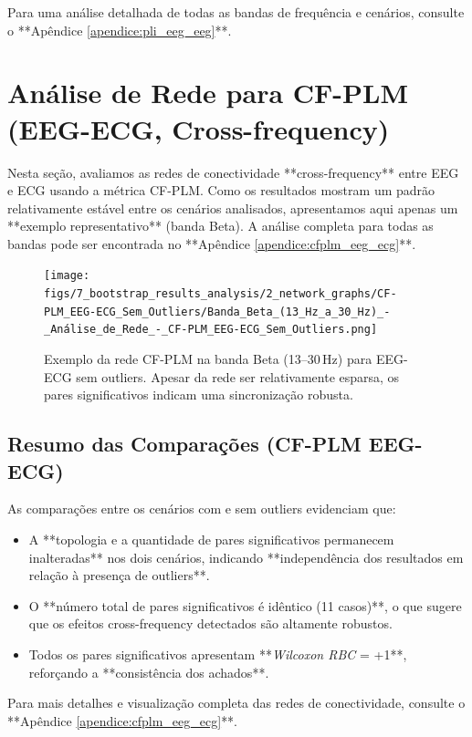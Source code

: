 Para uma análise detalhada de todas as bandas de frequência e cenários, consulte o **Apêndice \ref{apendice:pli_eeg_eeg}**.

\section{Análise de Rede para CF-PLM (EEG-ECG, Cross-frequency)}
\label{sec:rede_cfplm_eeg_ecg}

Nesta seção, avaliamos as redes de conectividade **cross-frequency** entre EEG e ECG usando a métrica CF-PLM. Como os resultados mostram um padrão relativamente estável entre os cenários analisados, apresentamos aqui apenas um **exemplo representativo** (banda Beta). A análise completa para todas as bandas pode ser encontrada no **Apêndice \ref{apendice:cfplm_eeg_ecg}**.

\begin{figure}[htb]
  \centering
  \texttt{[image: figs/7\_bootstrap\_results\_analysis/2\_network\_graphs/CF-PLM\_EEG-ECG\_Sem\_Outliers/Banda\_Beta\_(13\_Hz\_a\_30\_Hz)\_-\_Análise\_de\_Rede\_-\_CF-PLM\_EEG-ECG\_Sem\_Outliers.png]}
  \caption{Exemplo da rede CF-PLM na banda Beta (13--30\,Hz) para EEG-ECG sem outliers. Apesar da rede ser relativamente esparsa, os pares significativos indicam uma sincronização robusta.}
  \label{fig:exemplo_rede_cfplm_beta_sem}
\end{figure}

\subsection{Resumo das Comparações (CF-PLM EEG-ECG)}

As comparações entre os cenários com e sem outliers evidenciam que:

\begin{itemize}
    \item A **topologia e a quantidade de pares significativos permanecem inalteradas** nos dois cenários, indicando **independência dos resultados em relação à presença de outliers**.
    \item O **número total de pares significativos é idêntico (11 casos)**, o que sugere que os efeitos cross-frequency detectados são altamente robustos.
    \item Todos os pares significativos apresentam **\emph{Wilcoxon RBC} = +1**, reforçando a **consistência dos achados**.
\end{itemize}

Para mais detalhes e visualização completa das redes de conectividade, consulte o **Apêndice \ref{apendice:cfplm_eeg_ecg}**.